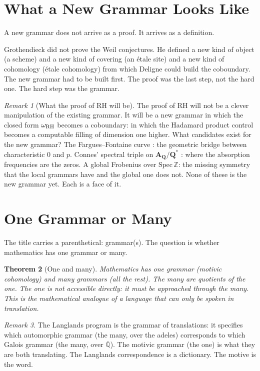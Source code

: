 \documentclass[12pt]{article}
\newtheorem{theorem}{Theorem}
\theoremstyle{definition}
\theoremstyle{remark}
\newtheorem{remark}[theorem]{Remark}
\begin{document}
\section{What a New Grammar Looks Like}

A new grammar does not arrive as a proof.
It arrives as a definition.

Grothendieck did not prove the Weil conjectures.
He defined a new kind of object (a scheme)
and a new kind of covering (an \'etale site)
and a new kind of cohomology (\'etale cohomology)
from which Deligne could build the coboundary.
The new grammar had to be built first.
The proof was the last step, not the hard one.
The hard step was the grammar.

\begin{remark}[What the proof of RH will be]
The proof of RH will not be a clever manipulation
of the existing grammar.
It will be a new grammar
in which the closed form $\omega_{\rm RH}$ becomes a coboundary:
in which the Hadamard product control becomes a
computable filling of dimension one higher.
What candidates exist for the new grammar?
The Fargues--Fontaine curve \cite{perfectoid}:
the geometric bridge between characteristic $0$ and $p$.
Connes' spectral triple on $\mathbf{A}_\mathbf{Q}/\mathbf{Q}^*$ \cite{connes}:
where the absorption frequencies are the zeros.
A global Frobenius over $\mathrm{Spec}\,\mathbb{Z}$:
the missing symmetry that the local grammars have and the global one does not.
None of these is the new grammar yet.
Each is a face of it.
\end{remark}

\section{One Grammar or Many}

The title carries a parenthetical: grammar(s).
The question is whether mathematics has one grammar or many.

\begin{theorem}[One and many]
Mathematics has one grammar (motivic cohomology) and many grammars
(all the rest). The many are quotients of the one.
The one is not accessible directly: it must be approached through the many.
This is the mathematical analogue of a language that can only be spoken
in translation.
\end{theorem}

\begin{remark}
The Langlands program \cite{langlands} is the grammar of translations:
it specifies which automorphic grammar (the many, over the adeles)
corresponds to which Galois grammar (the many, over $\bar{\mathbb{Q}}$).
The motivic grammar (the one) is what they are both translating.
The Langlands correspondence is a dictionary.
The motive is the word.
\end{remark}
\end{document}
